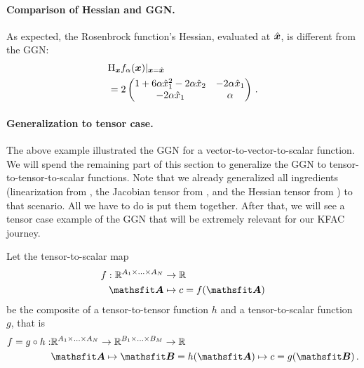 \begin{example}
 \paragraph{Comparison of Hessian and GGN.}
 As expected, the Rosenbrock function's Hessian, evaluated at $\hat{{\bm{x}}}$, is different from the GGN:
  \begin{align*}
    &\mathrm{H}_{{\bm{x}}} f_{\alpha}({\bm{x}})|_{{\bm{x}} = \hat{{\bm{x}}}}
      \\
    &=
    2
    \begin{pmatrix}
      1 + 6 \alpha \hat{x}_1^2 - 2 \alpha \hat{x}_2 & -2 \alpha \hat{x}_1 \\
      -2 \alpha \hat{x}_1                      & \alpha
    \end{pmatrix}\,.
  \end{align*}
\end{example}

\paragraph{Generalization to tensor case.} The above example illustrated the GGN for a vector-to-vector-to-scalar function.
We will spend the remaining part of this section to generalize the GGN to tensor-to-tensor-to-scalar functions.
Note that we already generalized all ingredients (linearization from , the Jacobian tensor from , and the Hessian tensor from ) to that scenario.
All we have to do is put them together.
After that, we will see a tensor case example of the GGN that will be extremely relevant for our KFAC journey.

\switchcolumn[1]
\switchcolumn[0]

\begin{setup}\label{setup:composite_tensor_to_tensor_to_scalar_function}
  Let the tensor-to-scalar map
  \begin{align*}
    f: \sR^{A_1 \times \ldots \times A_N} & \to \sR
    \\
    \tA                                   & \mapsto c = f(\tA)
  \end{align*}
  be the composite of a tensor-to-tensor function $h$ and a tensor-to-scalar function $g$, that is
  \begin{align*}
    f = g \circ h: & \sR^{A_1 \times \ldots \times A_N} \to \sR^{B_1 \times \ldots \times B_M}  \to \sR\!\!
    \\
                   & \tA \mapsto \tB = h(\tA) \mapsto c = g(\tB)\,.
  \end{align*}
\end{setup}

